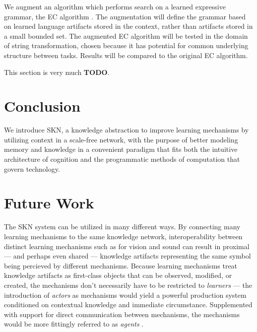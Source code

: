 \documentclass[11pt,letterpaper]{article}
\begin{document}
We augment an algorithm which performs search on a learned expressive
grammar, the EC algorithm \cite{dechter13}. The augmentation will define the
grammar based on learned language artifacts stored in the context, rather
than artifacts stored in a small bounded set. The augmented EC algorithm
will be tested in the domain of string transformation, chosen because it has
potential for common underlying structure between tasks. Results will be
compared to the original EC algorithm.

This section is very much {\bf TODO}.


\section{Conclusion}

We introduce SKN, a knowledge abstraction to improve learning mechanisms by
utilizing context in a scale-free network, with the purpose of better
modeling memory and knowledge in a convenient paradigm that fits both the
intuitive architecture of cognition and the programmatic methods of
computation that govern technology.


\section{Future Work}

The SKN system can be utilized in many different ways. By connecting many
learning mechanisms to the same knowledge network, interoperability between
distinct learning mechanisms such as for vision and sound can result in
proximal --- and perhaps even shared --- knowledge artifacts representing
the same symbol being percieved by different mechanisms. Because learning
mechanisms treat knowledge artifacts as first-class objects that can be
observed, modified, or created, the mechanisms don't necessarily have to be
restricted to \emph{learners} --- the introduction of \emph{actors} as
mechanisms would yield a powerful production system conditioned on
contextual knowledge and immediate circumstance. Supplemented with support
for direct communication between mechanisms, the mechanisms would be more
fittingly referred to as
\emph{agents} \cite{minsky88}.
\end{document}
